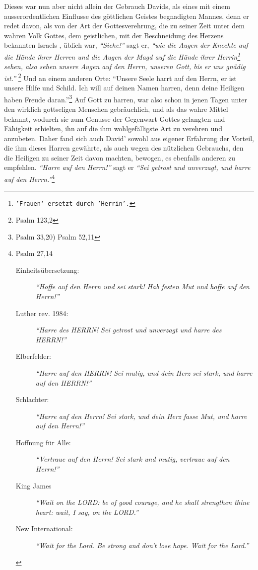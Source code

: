 \medskip

Dieses war nun aber nicht allein der Gebrauch Davids, als eines mit einem
ausserordentlichen Einflusse des göttlichen Geistes begnadigten Mannes, denn er
redet davon, als von der Art der Gottesverehrung, die zu seiner Zeit unter dem
wahren Volk Gottes, dem geistlichen, mit der
Beschneidung des Herzens  bekannten
Israels , üblich war, \textit{"`Siehe!"'} sagt er,
\textit{"`wie die Augen der Knechte auf die
Hände ihrer Herren und die Augen der Magd auf die Hände ihrer
Herrin\footnote{\texttt{'Frauen' ersetzt durch 'Herrin'.}} sehen,
also sehen unsere Augen auf den Herrn, unseren Gott, bis er uns gnädig
ist."'} 
\footnote{Psalm 123,2}
Und an einem anderen Orte:
"`Unsere Seele harrt auf den Herrn, er ist unsere Hilfe und Schild. Ich will
auf deinen Namen harren,
denn deine Heiligen haben Freude daran."'\footnote{Psalm 33,20) Psalm 52,11}
Auf Gott zu harren, war also schon in jenen Tagen unter den wirklich gottseligen
Menschen gebräuchlich, und als das wahre Mittel bekannt, wodurch sie zum Genusse
der Gegenwart Gottes  gelangten und Fähigkeit
erhielten, ihn auf die ihm
wohlgefälligste Art zu verehren und anzubeten. Daher fand sich auch David'
sowohl aus eigener Erfahrung der Vorteil, die ihm
dieses Harren gewährte, als
auch wegen des nützlichen Gebrauchs, den die Heiligen zu seiner Zeit davon
machten, bewogen, es ebenfalls anderen zu empfehlen.
\textit{"`Harre auf den Herrn!"'}  sagt
er
\textit{"`Sei getrost und unverzagt, und harre auf den Herrn."'}\footnote{Psalm
27,14
\begin{description}
 \item[Einheitsübersetzung:] \textit{"`Hoffe auf den Herrn und sei stark! Hab
festen Mut und hoffe auf den Herrn!"'}
 \item[Luther rev. 1984:] \textit{"`Harre des HERRN! Sei getrost und unverzagt
und harre des HERRN!"'}
 \item[Elberfelder:] \textit{"`Harre auf den HERRN! Sei mutig, und dein Herz sei
stark, und harre auf den HERRN!"'}
 \item[Schlachter:] \textit{"`Harre auf den Herrn! Sei stark, und dein Herz
fasse Mut, und harre auf den Herrn!"'}
 \item[Hoffnung für Alle:] \textit{"`Vertraue auf den Herrn! Sei stark und
mutig, vertraue auf den Herrn!"'}
 \item[King James]
\textit{ "`Wait on the LORD: be of good courage, and he shall strengthen thine
heart: wait, I say, on the LORD."'}
 \item[New International:] \textit{ "`Wait for the Lord. Be strong and don't
lose hope. Wait for the Lord."'}
 \end{description}
}
